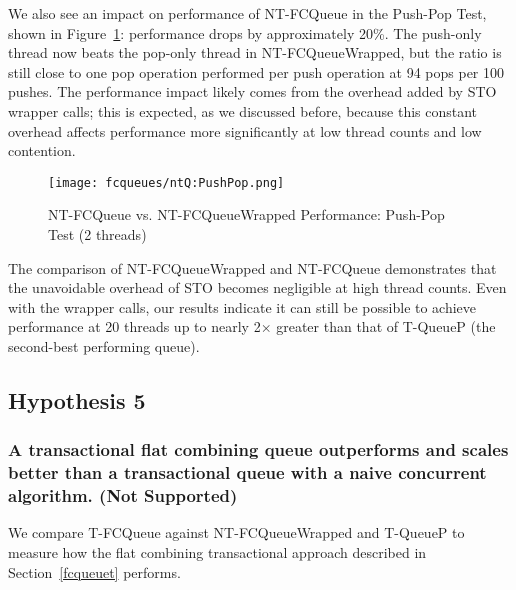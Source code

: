 We also see an impact on performance of NT-FCQueue in the Push-Pop Test, shown in Figure~\ref{fig:wrappedqs_pp}: performance drops by approximately 20\%. The push-only thread now beats the pop-only thread in NT-FCQueueWrapped, but the ratio is still close to one pop operation performed per push operation at 94 pops per 100 pushes. The performance impact likely comes from the overhead added by STO wrapper calls; this is expected, as we discussed before, because this constant overhead affects performance more significantly at low thread counts and low contention.

\begin{figure}[t!]
    \centering
	\begin{minipage}{\textwidth}
        {\texttt{[image: fcqueues/ntQ:PushPop.png]}}
	\end{minipage}
    \caption{NT-FCQueue vs. NT-FCQueueWrapped Performance: Push-Pop Test (2 threads)}
    \label{fig:wrappedqs_pp}
\end{figure}


The comparison of NT-FCQueueWrapped and NT-FCQueue demonstrates that the unavoidable overhead of STO becomes negligible at high thread counts. Even with the wrapper calls, our results indicate it can still be possible to achieve performance at 20 threads up to nearly 2$\times$ greater than that of T-QueueP (the second-best performing queue).

\vspace{12pt}
\noindent{}

\subsection{Hypothesis 5}
\subsubsection{A transactional flat combining queue outperforms and scales better than a transactional queue with a naive concurrent algorithm. (Not Supported)}
\label{eval:hypo5}

We compare T-FCQueue against NT-FCQueueWrapped and T-QueueP to measure how the flat combining transactional approach described in Section~\ref{fcqueuet} performs.

